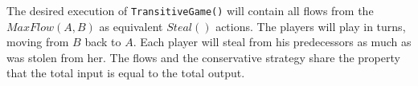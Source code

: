 \begin{proofsketch}
   The desired execution of \texttt{TransitiveGame()} will contain all flows from the $MaxFlow\left(A, B\right)$ as
   equivalent $Steal\left(\right)$ actions. The players will play in turns, moving from $B$ back to $A$. Each player will
   steal from his predecessors as much as was stolen from her. The flows and the conservative strategy share the property
   that the total input is equal to the total output.
\end{proofsketch}
